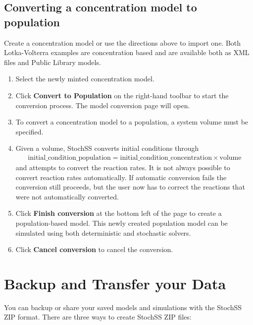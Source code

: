 \subsection{Converting a concentration model to population}
Create a concentration model or use the directions above to import one. Both Lotka-Volterra examples are concentration based and are available both as XML files and Public Library models.

\begin{enumerate}
  \item Select the newly minted concentration model.
  \item Click \textbf{Convert to Population} on the right-hand toolbar to start the conversion process. The model conversion page will open.
  \item To convert a concentration model to a population, a system volume must be specified.
  \item Given a volume, StochSS converts initial conditions through 
  \begin{align}
  \mathrm{initial\_condition\_population} = \mathrm{initial\_condition\_concentration}\times\mathrm{volume}
  \end{align}
   and attempts to convert the reaction rates. It is not always possible to convert reaction rates automatically. If automatic conversion fails the conversion still proceeds, but the user now has to correct the reactions that were not automatically converted.
  \item Click \textbf{Finish conversion} at the bottom left of the page to create a population-based model. This newly created population model can be simulated using both deterministic and stochastic solvers.
  \item Click \textbf{Cancel conversion} to cancel the conversion.
\end{enumerate}


\section{Backup and Transfer your Data}
You can backup or share your saved models and simulations with the StochSS ZIP format. There are three ways to create StochSS ZIP files:

